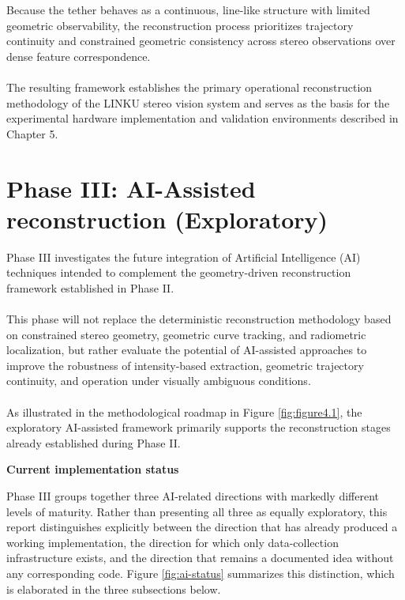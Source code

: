 Because the tether behaves as a continuous, line-like structure with limited geometric observability, the reconstruction process prioritizes trajectory continuity and constrained geometric consistency across stereo observations over dense feature correspondence.
\\\\
The resulting framework establishes the primary operational reconstruction methodology of the LINKU stereo vision system and serves as the basis for the experimental hardware implementation and validation environments described in Chapter 5.

\section{Phase III: AI-Assisted reconstruction (Exploratory)}
 
Phase III investigates the future integration of Artificial Intelligence (AI) techniques intended to complement the geometry-driven reconstruction framework established in Phase II.
\\\\
This phase will not replace the deterministic reconstruction methodology based on constrained stereo geometry, geometric curve tracking, and radiometric localization, but rather evaluate the potential of AI-assisted approaches to improve the robustness of intensity-based extraction, geometric trajectory continuity, and operation under visually ambiguous conditions.
\\\\
As illustrated in the methodological roadmap in Figure \ref{fig:figure4.1}, the exploratory AI-assisted framework primarily supports the reconstruction stages already established during Phase II.
\newpage
\clearpage

\noindent \textbf{Current implementation status}
\vspace{0.2cm}

Phase III groups together three AI-related directions with markedly different levels of maturity. Rather than presenting all three as equally exploratory, this report distinguishes explicitly between the direction that has already produced a working implementation, the direction for which only data-collection infrastructure exists, and the direction that remains a documented idea without any corresponding code. Figure \ref{fig:ai-status} summarizes this distinction, which is elaborated in the three subsections below.



